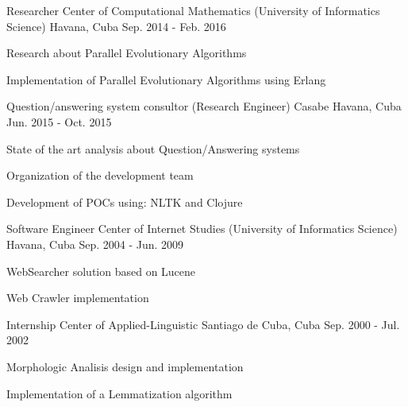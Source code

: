 \begin{cventries}
\cventry
{Researcher} %
{Center of Computational Mathematics (University of Informatics Science)} %
{Havana, Cuba} %
{Sep. 2014 - Feb. 2016} %
{ %
\begin{cvitems}
\item {Research about Parallel Evolutionary Algorithms}
\item {Implementation of Parallel Evolutionary Algorithms using Erlang}
\end{cvitems}
}


\cventry
{Question/answering system consultor (Research Engineer)} %
{Casabe} %
{Havana, Cuba} %
{Jun. 2015 - Oct. 2015} %
{ %
\begin{cvitems}
\item {State of the art analysis about Question/Answering systems}
\item {Organization of the development team}
\item {Development of POCs using: NLTK and Clojure}
\end{cvitems}
}


\cventry
{Software Engineer} %
{Center of Internet Studies (University of Informatics Science)} %
{Havana, Cuba} %
{Sep. 2004 - Jun. 2009} %
{ %
\begin{cvitems}
\item {WebSearcher solution based on Lucene}
\item {Web Crawler implementation}
\end{cvitems}
}


\cventry
{Internship} %
{Center of Applied-Linguistic} %
{Santiago de Cuba, Cuba} %
{Sep. 2000 - Jul. 2002} %
{ %
\begin{cvitems}
\item {Morphologic Analisis design and implementation}
\item {Implementation of a Lemmatization algorithm}
\end{cvitems}
}


\end{cventries}
